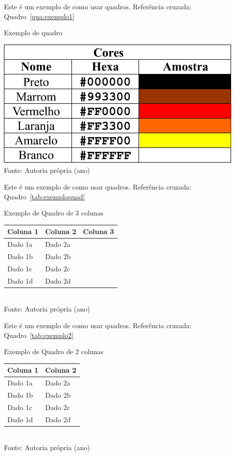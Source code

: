 Este é um exemplo de como usar quadros. Referência cruzada: Quadro~\ref{qua:exemplo1}


\begin{quadro}[!htbp]
	\centering
	\caption{Exemplo de quadro}
	\includegraphics[scale=.7]{imagens/exemploQuadro}
	\\Fonte: Autoria própria (ano)
	\label{qua:exemplo1}
\end{quadro}


Este é um exemplo de como usar quadros. Referência cruzada: Quadro~\ref{tab:exemploquad}

\begin{quadro}[!htbp]
\centering
\caption{Exemplo de Quadro de 3 colunas}
	\begin{tabular}{ | m{10em} | m{4cm}| m{4cm} | }
		\hline
		\textbf{Coluna 1} & \textbf{Coluna 2} & \textbf{Coluna 3} \\ \hline
		Dado 1a           & Dado 2a & \\ \hline
		Dado 1b           & Dado 2b & \\ \hline
		Dado 1c           & Dado 2c & \\ \hline
		Dado 1d           & Dado 2d & \\ \hline
	\end{tabular}
	\\ \vspace{0.2cm}
	Fonte: Autoria própria (ano)
	\label{tab:exemploquad}
\end{quadro}

Este é um exemplo de como usar quadros. Referência cruzada: Quadro~\ref{tab:exemplo2}

\begin{quadro}[!htbp]
\centering
\caption{Exemplo de Quadro de 2 colunas}
	\begin{tabular}{ | m{10em} | m{4cm}| }
		\hline
		\textbf{Coluna 1} & \textbf{Coluna 2}  \\ \hline
		Dado 1a           & Dado 2a  \\ \hline
		Dado 1b           & Dado 2b  \\ \hline
		Dado 1c           & Dado 2c  \\ \hline
		Dado 1d           & Dado 2d  \\ \hline
	\end{tabular}
	\\ \vspace{0.2cm}
	Fonte: Autoria própria (ano)
	\label{tab:exemplo2}
\end{quadro}

